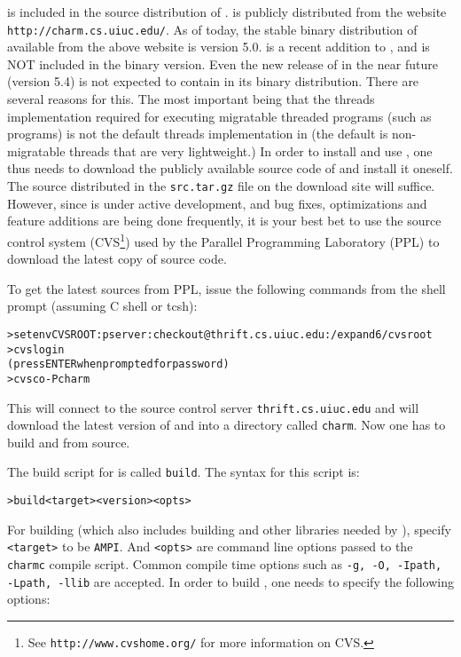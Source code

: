 \documentclass[10pt]{article}
\begin{document}
\ampi{} is included in the source distribution of \charmpp{}. \charmpp{} is
publicly distributed from the website \verb+http://charm.cs.uiuc.edu/+.  As of
today, the stable binary distribution of \charmpp{} available from the above
website is version 5.0. \ampi{} is a recent addition to \charmpp{}, and is NOT
included in the binary version. Even the new release of \charmpp{} in the near
future (version 5.4) is not expected to contain \ampi{} in its binary
distribution. There are several reasons for this. The most important being that
the threads implementation required for executing migratable threaded programs
(such as \ampi{} programs) is not the default threads implementation in
\charmpp{} (the default is non-migratable threads that are very lightweight.)
In order to install and use \ampi{}, one thus needs to download the publicly
available source code of \charmpp{} and install it oneself. The source
distributed in the \verb+src.tar.gz+ file on the download site will suffice.
However, since \ampi{} is under active development, and bug fixes,
optimizations and feature additions are being done frequently, it is your best
bet to use the source control system (CVS\footnote{See
\texttt{http://www.cvshome.org/} for more information on CVS.}) used by the
Parallel Programming Laboratory (PPL) to download the latest copy of \charmpp{}
source code.

To get the latest sources from PPL, issue the following commands from the shell
prompt (assuming C shell or tcsh):

\begin{alltt}
> setenv CVSROOT :pserver:checkout@thrift.cs.uiuc.edu:/expand6/cvsroot
> cvs login
(press ENTER when prompted for password)
> cvs co -P charm
\end{alltt}

This will connect to the source control server \verb+thrift.cs.uiuc.edu+ and
will download the latest version of \charmpp{} and \ampi{} into a directory
called \texttt{charm}. Now one has to build \charmpp{} and \ampi{} from source.

The build script for \charmpp{} is called \texttt{build}. The syntax for this
script is:

\begin{alltt}
> build <target> <version> <opts>
\end{alltt}

For building \ampi{} (which also includes building \charmpp{} and other
libraries needed by \ampi{}), specify \verb+<target>+ to be \verb+AMPI+. And
\verb+<opts>+ are command line options passed to the \verb+charmc+ compile
script.  Common compile time options such as \texttt{-g, -O, -Ipath, -Lpath,
-llib} are accepted. In order to build \ampi{}, one needs to specify the
following options:
\end{document}
